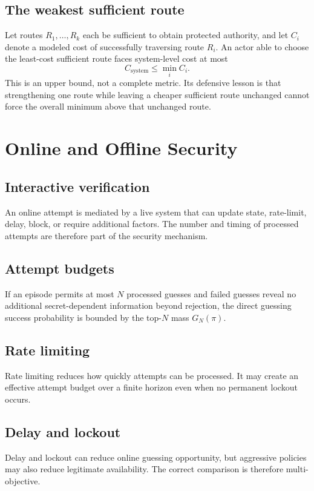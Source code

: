 \documentclass[11pt,oneside]{book}
\theoremstyle{definition}
\theoremstyle{remark}
\begin{document}
\section{The weakest sufficient route}
\label{sec:weakest-route}
Let routes $R_1,\ldots,R_k$ each be sufficient to obtain protected authority, and let $C_i$ denote a modeled cost of successfully traversing route $R_i$. An actor able to choose the least-cost sufficient route faces system-level cost at most
\[
C_{\mathrm{system}}\le \min_i C_i.
\]
This is an upper bound, not a complete metric. Its defensive lesson is that strengthening one route while leaving a cheaper sufficient route unchanged cannot force the overall minimum above that unchanged route.

\chapter{Online and Offline Security}
\label{ch:online-offline}
\section{Interactive verification}
An online attempt is mediated by a live system that can update state, rate-limit, delay, block, or require additional factors. The number and timing of processed attempts are therefore part of the security mechanism.

\section{Attempt budgets}
If an episode permits at most $N$ processed guesses and failed guesses reveal no additional secret-dependent information beyond rejection, the direct guessing success probability is bounded by the top-$N$ mass $G_N(\pi)$.

\section{Rate limiting}
Rate limiting reduces how quickly attempts can be processed. It may create an effective attempt budget over a finite horizon even when no permanent lockout occurs.

\section{Delay and lockout}
Delay and lockout can reduce online guessing opportunity, but aggressive policies may also reduce legitimate availability. The correct comparison is therefore multi-objective.
\end{document}
